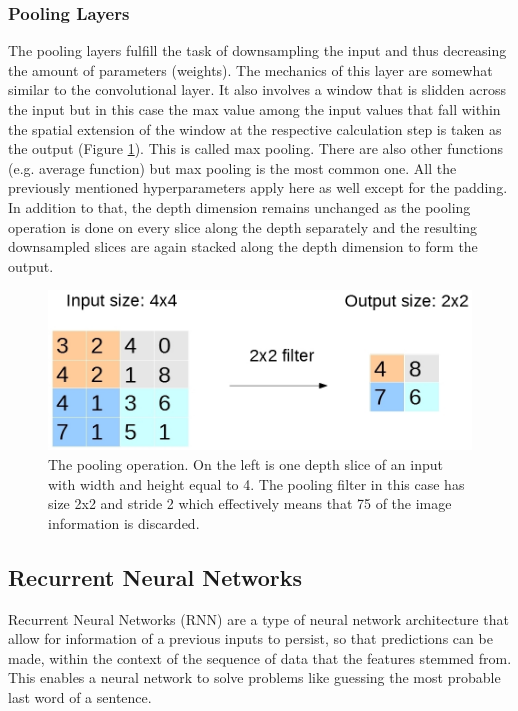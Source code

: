 \documentclass{article}
\begin{document}
\subsubsection{Pooling Layers}
The pooling layers fulfill the task of downsampling the input and thus decreasing the amount of parameters (weights). The mechanics of this layer are somewhat similar to the convolutional layer. It also involves a window that is slidden across the input but in this case the max value among the input values that fall within the spatial extension of the window at the respective calculation step is taken as the output (Figure \ref{fig:Pooling}). This is called max pooling. There are also other functions (e.g. average function) but max pooling is the most common one. All the previously mentioned hyperparameters apply here as well except for the padding. In addition to that, the depth dimension remains unchanged as the pooling operation is done on every slice along the depth separately and the resulting downsampled slices are again stacked along the depth dimension to form the output.
\begin{figure}[H]
\begin{center}
\includegraphics[scale=0.4]{rsz_1pooling}
\end{center}
\caption{The pooling operation. On the left is one depth slice of an input with width and height equal to 4. The pooling filter in this case has size 2x2 and stride 2 which effectively means that 75\text{\%} of the image information is discarded.}
\label{fig:Pooling}
\end{figure}

\subsection{Recurrent Neural Networks}
Recurrent Neural Networks (RNN) are a type of neural network architecture that allow for information of a previous inputs to persist, so that predictions can be made, within the context of the sequence of data that the features stemmed from. This enables a neural network to solve problems like guessing the most probable last word of a sentence\cite{Goodfellow2}.
\end{document}
